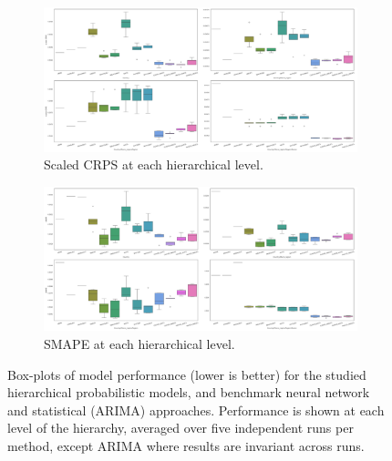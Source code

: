 \documentclass[letterpaper]{article}
\begin{document}
\begin{figure}
    \centering
     \begin{subfigure}[b]{\textwidth}
         \centering
         \includegraphics[width=\textwidth]{perf_stat_NN_fullhier.png}
         \caption{Scaled CRPS at each hierarchical level.}
         \label{fig:y equals x}
     \end{subfigure}
     \begin{subfigure}[b]{\textwidth}
         \centering
         \includegraphics[width=\textwidth]{perf_stat_NN_fullhier_smape.png}
         \caption{SMAPE at each hierarchical level.}
         \label{fig:three sin x}
     \end{subfigure}
     \hfill
        \caption{
Box-plots of model performance (lower is better) for the studied hierarchical probabilistic models, and benchmark neural network and statistical (ARIMA) approaches. Performance is shown at each level of the hierarchy, averaged over five independent runs per method, except ARIMA where results are invariant across runs. 
}
    \label{fig:benchmarkplots}
\end{figure}
\end{document}
